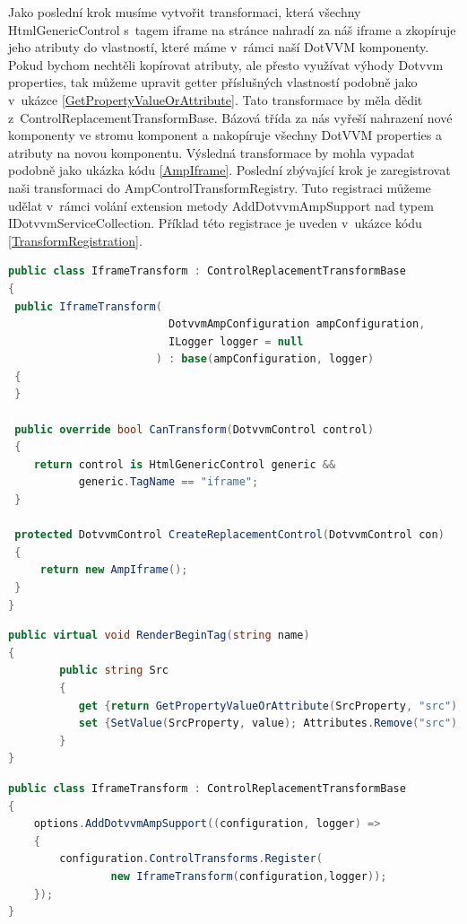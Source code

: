 Jako poslední krok musíme vytvořit transformaci, která všechny HtmlGenericControl s~tagem iframe na stránce nahradí za náš iframe a zkopíruje jeho atributy do vlastností, které máme v~rámci naší DotVVM komponenty. Pokud bychom nechtěli kopírovat atributy, ale přesto využívat výhody Dotvvm properties, tak můžeme upravit getter příslušných vlastností podobně jako v~ukázce \ref{GetPropertyValueOrAttribute}.  Tato transformace by měla dědit z~ControlReplacementTransformBase. Bázová třída za nás vyřeší nahrazení nové komponenty ve stromu komponent a nakopíruje všechny DotVVM properties a atributy na novou komponentu. Výsledná transformace by mohla vypadat podobně jako ukázka kódu  \ref{AmpIframe}. Poslední zbývající krok je zaregistrovat naši transformaci do AmpControlTransformRegistry. Tuto registraci můžeme udělat v~rámci volání extension metody AddDotvvmAmpSupport nad typem IDotvvmServiceCollection. Příklad této registrace je uveden v~ukázce kódu \ref{TransformRegistration}.
\begin{lstlisting}[language=c#, caption=Ukázka možné implementace tranformace pro iframe,label=AmpIframe,captionpos=t]
public class IframeTransform : ControlReplacementTransformBase
{
 public IframeTransform(
                         DotvvmAmpConfiguration ampConfiguration,
                         ILogger logger = null
                       ) : base(ampConfiguration, logger)
 {
 }

 public override bool CanTransform(DotvvmControl control)
 {
    return control is HtmlGenericControl generic &&
           generic.TagName == "iframe";
 }

 protected DotvvmControl CreateReplacementControl(DotvvmControl con)
 {
     return new AmpIframe();
 }
}
\end{lstlisting}

\begin{lstlisting}[language=c#, caption=Možný způsob jak se vyhnout kopírování HTML atributů do DotVVM property. ,label=GetPropertyValueOrAttribute,captionpos=t]
public virtual void RenderBeginTag(string name)
{
        public string Src
        {
           get {return GetPropertyValueOrAttribute(SrcProperty, "src");}
           set {SetValue(SrcProperty, value); Attributes.Remove("src");}
        }
}
\end{lstlisting}

    \begin{lstlisting}[language=c#, caption=Ukazka možné implementace tranformace pro iframe,label=TransformRegistration,captionpos=t]
public class IframeTransform : ControlReplacementTransformBase
{
    options.AddDotvvmAmpSupport((configuration, logger) =>
    {
        configuration.ControlTransforms.Register(
                new IframeTransform(configuration,logger));
    });
}
\end{lstlisting}

